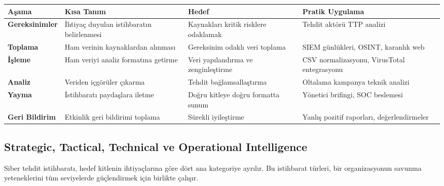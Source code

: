 \begin{longtable}{|p{2.5cm}|p{3cm}|p{3cm}|p{3.5cm}|}
\hline
\textbf{Aşama} & \textbf{Kısa Tanım} & \textbf{Hedef} & \textbf{Pratik Uygulama} \\
\hline
\textbf{Gereksinimler} & İhtiyaç duyulan istihbaratın belirlenmesi & Kaynakları kritik risklere odaklamak & Tehdit aktörü TTP analizi \\
\hline
\textbf{Toplama} & Ham verinin kaynaklardan alınması & Gereksinim odaklı veri toplama & SIEM günlükleri, OSINT, karanlık web \\
\hline
\textbf{İşleme} & Ham veriyi analiz formatına getirme & Veri yapılandırma ve zenginleştirme & CSV normalizasyonu, VirusTotal entegrasyonu \\
\hline
\textbf{Analiz} & Veriden içgörüler çıkarma & Tehdit bağlamsallaştırma & Oltalama kampanya teknik analizi \\
\hline
\textbf{Yayma} & İstihbaratı paydaşlara iletme & Doğru kitleye doğru formatta sunum & Yönetici brifingi, SOC beslemesi \\
\hline
\textbf{Geri Bildirim} & Etkinlik geri bildirimi toplama & Sürekli iyileştirme & Yanlış pozitif raporları, değerlendirmeler \\
\hline
\end{longtable}

\subsection{Strategic, Tactical, Technical ve Operational Intelligence}

Siber tehdit istihbaratı, hedef kitlenin ihtiyaçlarına göre dört ana kategoriye ayrılır. Bu istihbarat türleri, bir organizasyonun savunma yeteneklerini tüm seviyelerde güçlendirmek için birlikte çalışır.

